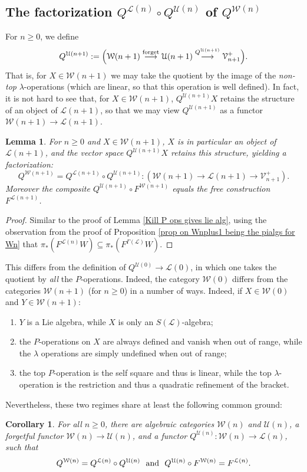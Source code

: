 \documentclass[11pt]{amsart} \renewcommand{\baselinestretch}{1.4}
\theoremstyle{plain}
\newtheorem{lem}[thm]{Lemma}
\newtheorem{cor}[thm]{Corollary}
\theoremstyle{definition}
\renewcommand{\to}{\longrightarrow}
\newcommand{\scrL}{\mathscr{L}}
\newcommand{\calU}{\mathcal{U}}
\newcommand{\calL}{\mathcal{L}}
\newcommand{\calV}{\mathcal{V}}
\newcommand{\calw}{\mathcal{W}}
\newcommand{\LieOperad}{{\scrL}}
\newcommand{\vect}[2]{\calV^{#1}_{#2}}
\begin{document}
\begin{homotopy operations for PRLs}
\subsection{The factorization $Q^{\calL(n)}\circ Q^{\calU(n)}$ of $Q^{\calw(n)}$}
For $n\geq0$, we define
\[Q^{\calU(n+1)}:=\Bigl(\calw(n+1)\overset{\textup{forget}}{\to}\calU(n+1)\overset{Q^{\calU(n+1)}}{\to}\vect{+}{n+1}\Bigr).\]
That is, for $X\in\calw(n+1)$ we may take the quotient by the image of the \emph{non-top} $\lambda$-operations (which are linear, so that this operation is well defined). In fact, it is not hard to see that, for $X\in\calw(n+1)$, $Q^{\calU(n+1)}X$ retains the structure of an object of $\calL(n+1)$, so that we may view $Q^{\calU(n+1)}$ as a functor $\calw(n+1)\to \calL(n+1)$.
\begin{lem}
\label{Kill lambda ops gives lie alg}
For $n\geq0$ and $X\in\calw(n+1)$, $X$ is in particular an object of $\calL(n+1)$, and the vector space $Q^{\calU(n+1)}X$ retains this structure, yielding a factorization:%
\[Q^{\calw(n+1)}=Q^{\calL(n+1)}\circ Q^{\calU(n+1)}:\left(\calw(n+1)\to \calL(n+1)\to \vect{+}{n+1}\right).\]
Moreover the composite $Q^{\calU(n+1)}\circ F^{\calw(n+1)}$ equals the free construction $F^{\calL(n+1)}$.
\end{lem}
\begin{proof}
Similar to the proof of Lemma \ref{Kill P ops gives lie alg}, using the observation from the proof of Proposition \ref{prop on Wnplus1 being the pialgs for Wn} that $\pi_*(F^{\calL(n)}W)\subseteq\pi_*(F^{\Gamma(\LieOperad)}W)$.
\end{proof}
This differs from the definition of $Q^{\calU(0)}\to \calL(0)$, in which one takes the quotient by \emph{all} the $P$-operations.
Indeed, the category $\calw(0)$ differs from the categories $\calw(n+1)$ (for $n\geq0$) in a number of ways. Indeed, if $X\in\calw(0)$ and $Y\in \calw(n+1) $:
\begin{enumerate}
\item $Y$ is a  Lie algebra, while $X$ is only an $S(\LieOperad)$-algebra;
\item the $P$-operations on $X$ are always defined and vanish when out of range, while the $\lambda$ operations are simply undefined when out of range;
\item the top $P$-operation is the self square and thus is linear, while the top $\lambda$-operation is the restriction and thus a quadratic refinement of the bracket.
\end{enumerate}
Nevertheless, these two regimes share at least the following common ground:
\begin{cor}
\label{indec functors common ground 0 and n}
For all $n\geq0$, there are algebraic categories $\calw(n)$ and $\calU(n)$, a forgetful functor $\calw(n)\to\calU(n)$, and a functor $Q^{\calU(n)}:\calw(n)\to \calL(n)$, such that
\[Q^{\calw(n)}=Q^{\calL(n)}\circ Q^{\calU(n)}\textup{\ \ and\ \ }Q^{\calU(n)}\circ F^{\calw(n)}=F^{\calL(n)}.\]
\end{cor}



\end{homotopy operations for PRLs}
\end{document}
